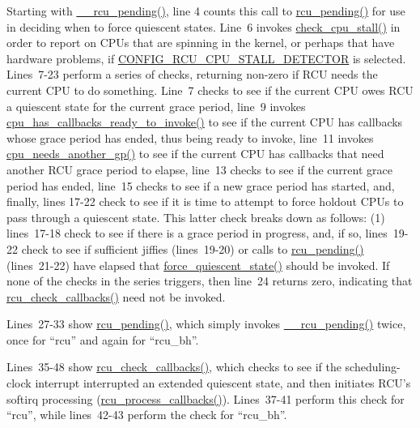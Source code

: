 Starting with \url{__rcu_pending()}, line 4 counts this call to
\url{rcu_pending()} for use in deciding when to force quiescent states.
Line~6 invokes \url{check_cpu_stall()} in order to report on CPUs
that are spinning in the kernel, or perhaps that have hardware problems,
if \url{CONFIG_RCU_CPU_STALL_DETECTOR} is selected.
Lines~7-23 perform a series of checks, returning non-zero if RCU
needs the current CPU to do something.
Line~7 checks to see if the current CPU owes RCU a quiescent state for the
current grace period,
line~9 invokes \url{cpu_has_callbacks_ready_to_invoke()} to see if
the current CPU has callbacks whose grace period has ended, thus being
ready to invoke,
line~11 invokes \url{cpu_needs_another_gp()} to see if the current
CPU has callbacks that need another RCU grace period to elapse,
line~13 checks to see if the current grace period has ended,
line~15 checks to see if a new grace period has started,
and, finally, lines 17-22 check to see if it is time to attempt
to force holdout CPUs to pass through a quiescent state.
This latter check breaks down as follows: (1) lines~17-18 check to see
if there is a grace period in progress, and, if so, lines~19-22
check to see if sufficient jiffies (lines~19-20) or calls to
\url{rcu_pending()} (lines~21-22) have elapsed that
\url{force_quiescent_state()} should be invoked.
If none of the checks in the series triggers, then line~24 returns
zero, indicating that \url{rcu_check_callbacks()} need not be invoked.

Lines~27-33 show \url{rcu_pending()}, which simply invokes
\url{__rcu_pending()} twice, once for ``rcu'' and again for
``rcu\_bh''.

 \QuickQuizEnd

Lines~35-48 show \url{rcu_check_callbacks()}, which checks to see
if the scheduling-clock interrupt interrupted an extended quiescent
state, and then initiates RCU's softirq processing
(\url{rcu_process_callbacks()}).
Lines~37-41 perform this check for ``rcu'', while lines~42-43
perform the check for ``rcu\_bh''.

